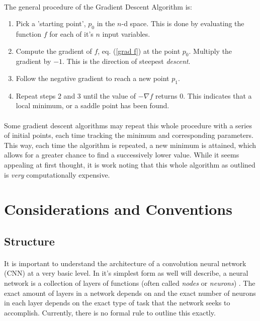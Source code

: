 \documentclass[12pt,letterpaper]{article}
\begin{document}
\paragraph*{}The general procedure of the Gradient Descent Algorithm is:
\begin{enumerate}
\item Pick a 'starting point', $p_0$ in the $n$-d space. This is done by  evaluating the function $f$ for each of it's $n$ input variables.
\item Compute the gradient of $f$, eq. (\ref{grad f}) at the point $p_0$. Multiply the gradient by $-1$. This is the direction of steepest \textit{descent}. 
\item Follow the negative gradient to reach a new point $p_1$. 
\item Repeat steps 2 and 3 until the value of $-\nabla f$ returns 0. This indicates that a local minimum, or a saddle point has been found.
\end{enumerate}
\paragraph*{}Some gradient descent algorithms may repeat this whole procedure with a series of initial points, each time tracking the minimum and corresponding parameters. This way, each time the algorithm is repeated, a new minimum is attained, which allows for a greater chance to find a successively lower value. While it seems appealing at first thought, it is work noting that this whole algorithm as outlined is \textit{very} computationally expensive.
\paragraph*{}


\section{Considerations and Conventions}

\subsection{Structure}
\paragraph*{}It is important to understand the architecture of a convolution neural network (CNN) at a very basic level. In it's simplest form as well will describe, a neural network is a collection of layers of functions (often called \textit{nodes} or \textit{neurons}) \cite{Goodfellow}. The exact amount of layers in a network depends on and the exact number of neurons in each layer depends on the exact type of task that the network seeks to accomplish. Currently, there is no formal rule to outline this exactly.
\end{document}
